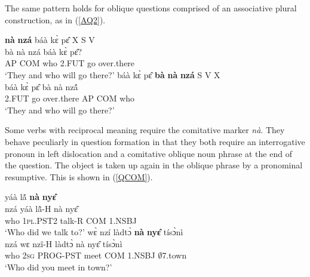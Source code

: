 \noindent The same pattern holds for oblique questions comprised of an associative plural construction, as in (\ref{AQ2}).

\begin{exe}
\ex\label{AQ2}
\begin{xlist}
\ex \label{AQ2a}
   {\bfseries nà} {\bfseries nzá} báà kɛ̀ pɛ̂ \hfill X S V \\
         bà nà nzá báà kɛ̀ pɛ̂? \\
           AP COM who 2.FUT go over.there \\
    \trans `They and who will go there?'
\ex \label{AQ2b}
  \glll  báà kɛ̀ pɛ̂ {\bfseries bà} {\bfseries nà} {\bfseries nzá} \hfill S V X \\
         báà kɛ̀ pɛ̂ bà nà nzá̂ \\
           2.FUT go over.there AP COM who \\
    \trans `They and who will go there?'
\end{xlist}
\end{exe}



Some verbs with reciprocal meaning require the comitative marker {\itshape nà}. They behave peculiarly in question formation in that they both require an interrogative pronoun in left dislocation and a comitative oblique noun phrase at the end of the question. The object is taken up again in the oblique phrase by a pronominal resumptive. This is shown in (\ref{QCOM}).

\begin{exe}
\ex\label{QCOM}
\begin{xlist}
\ex \label{QCOM1}
   yáà lã́ {\bfseries nà} {\bfseries nyɛ̂}  \\
              nzá yáà lã̂-H nà nyɛ̂ \\
                who 1\textsc{pl}.PST2 talk-R COM 1.NSBJ \\
    \trans `Who did we talk to?'
\ex\label{QCOM2}
  wɛ̀ nzí làdtɔ̀ {\bfseries nà} {\bfseries nyɛ̂} tísɔ̀nì \\
            nzá wɛ nzî-H làdtɔ̀ nà nyɛ̂ tísɔ̀nì \\
              who 2\textsc{sg} PROG-PST meet COM 1.NSBJ  $\emptyset$7.town \\
    \trans `Who did you meet in town?'
\end{xlist}
\end{exe}



